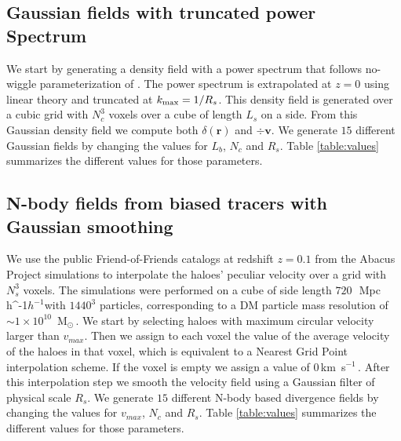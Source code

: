 \documentclass[usenatbib]{mnras}
\newcommand{\Msun}{\,{\rm M}$_{\odot}$\,}
\newcommand{\Mpch}{\,{\rm Mpc}\,\ifmmode h^{-1}\else $h^{-1}$\fi}
\newcommand{\kms}{\,{\rm km}\ s$^{-1}$\,}
\begin{document}
\subsection{Gaussian fields with truncated power Spectrum}

We start by generating a density field with a power spectrum that follows no-wiggle parameterization of \cite{1998ApJ...496..605E}.
The power spectrum is extrapolated at $z=0$ using linear theory and truncated at $k_{\rm max}=1/R_s$.
This density field is generated over a cubic grid with $N_c^3$ voxels over a cube of length $L_s$ on a side.
From this Gaussian density field we compute both $\delta(\textbf{r})$ and $\div \textbf{v}$.
We generate $15$ different Gaussian fields by changing the values for $L_b$, $N_c$ and $R_s$. 
Table \ref{table:values} summarizes the different values for those parameters.

\subsection{N-body fields from biased tracers with Gaussian smoothing}

We use the public Friend-of-Friends catalogs at redshift $z=0.1$
from the Abacus Project simulations to interpolate the haloes' peculiar velocity over a grid with $N_s^3$ voxels.
The simulations were performed on a cube of side length $720$\ \Mpch with
$1440^3$ particles, corresponding to a DM particle mass resolution of $\sim 1 \times 10^{10}$ \Msun.
We start by selecting haloes with maximum circular velocity larger
than $v_{max}$.
Then we assign to each voxel the value of the average velocity of the haloes in that voxel, which is equivalent to a Nearest Grid Point interpolation scheme. 
If the voxel is empty we assign a value of $0$\kms.
After this interpolation step we smooth the velocity field using a Gaussian filter of physical scale $R_s$.
We generate $15$ different N-body based divergence fields by changing the values for $v_{max}$, $N_c$ and $R_s$. 
Table \ref{table:values} summarizes the different values for those parameters.
\end{document}

